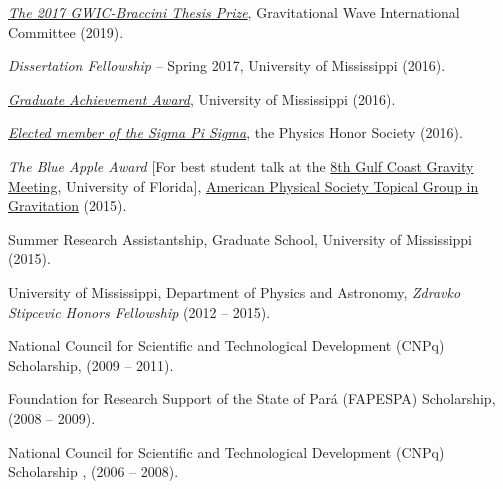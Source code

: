 \documentclass[10pt]{article}
\begin{document}
\begin{bibenum}
    \item \href{https://gwic.ligo.org/thesis-prize.html}{\emph{The 2017 GWIC-Braccini Thesis Prize}},
        Gravitational Wave International Committee (2019).

    \item {\emph{Dissertation Fellowship} -- Spring 2017},
    University of Mississippi (2016).

    \item \href{http://physics.olemiss.edu/hector-okada-da-silva-is-a-winner-of-the-2016-graduate-student-achievement-award/}{\emph{Graduate Achievement Award}},
    University of Mississippi (2016).

    \item \href{http://physics.olemiss.edu/sigma-pi-sigma/}{\emph
    {Elected member of the Sigma Pi Sigma}}, the Physics Honor Society (2016).

    \item \emph{The Blue Apple Award} [For best student talk at the \href{http://www.phys.ufl.edu/events/gcgm8/index.html}{8th Gulf Coast
        Gravity Meeting}, University of Florida],
    \href{https://www.aps.org/units/dgrav/}{American Physical Society Topical Group in Gravitation} (2015).

    \item Summer Research Assistantship,
    Graduate School, University of Mississippi (2015).

    \item University of Mississippi, Department of Physics and Astronomy,
    \emph{Zdravko Stipcevic Honors Fellowship}
    (2012 -- 2015).

    \item National Council for Scientific and Technological Development (CNPq) Scholarship, (2009 -- 2011).

    \item Foundation for Research Support of the State of Par\'a (FAPESPA) Scholarship,
    (2008 -- 2009).

    \item National Council for Scientific and Technological Development (CNPq) Scholarship , (2006 -- 2008).
\end{bibenum}
\end{document}
